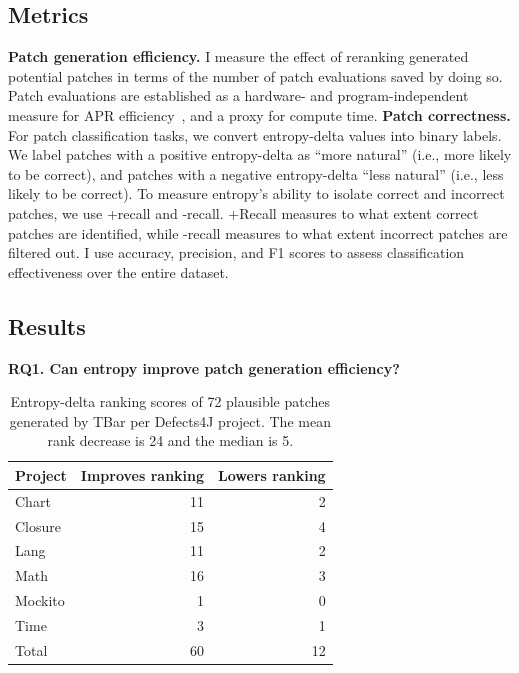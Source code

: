\documentclass[12pt,openany,oneside,table]{cmuthesis}
\begin{document}
\subsection{Metrics}
\label{sec:metrics}
\noindent\textbf{Patch generation efficiency.} I measure the effect of
reranking generated potential patches in terms of the number of patch
evaluations saved by doing so.  Patch evaluations are established as a
hardware- and program-independent measure for APR efficiency~\cite{efficiency},
and a proxy for compute time. 
\noindent\textbf{Patch correctness.}
For patch classification tasks, we convert entropy-delta values into binary labels. We
label patches with a positive entropy-delta as ``more natural'' (i.e., more
likely to be correct), and patches with a negative entropy-delta ``less
natural'' (i.e., less likely to be correct). To measure entropy's ability to
isolate correct and incorrect patches, we use +recall and -recall. +Recall
measures to what extent correct patches are identified, while -recall measures to
what extent incorrect patches are filtered out.  I use accuracy, precision, and
F1 scores to assess classification effectiveness over the entire dataset. 

\subsection{Results}

\noindent\textbf{RQ1. Can entropy improve patch generation efficiency?}

\begin{table}[t]
  \centering
\caption{Entropy-delta ranking scores of 72 plausible patches generated by TBar per Defects4J project. The mean rank decrease is 24 and the median is 5.}
\begin{tabular}{l|rr}
\toprule
\textbf{Project}  & \textbf{Improves ranking}& \textbf{Lowers ranking}   \\
\midrule
Chart  & 11 &  2 \\
Closure  & 15 &  4 \\
Lang  & 11 &  2 \\
Math  & 16 &  3 \\
Mockito  & 1 &  0 \\
Time  & 3 &  1 \\
Total & 60 & 12 \\
\bottomrule
\end{tabular}
\label{table:patch_efficiency}
\end{table}
\end{document}
